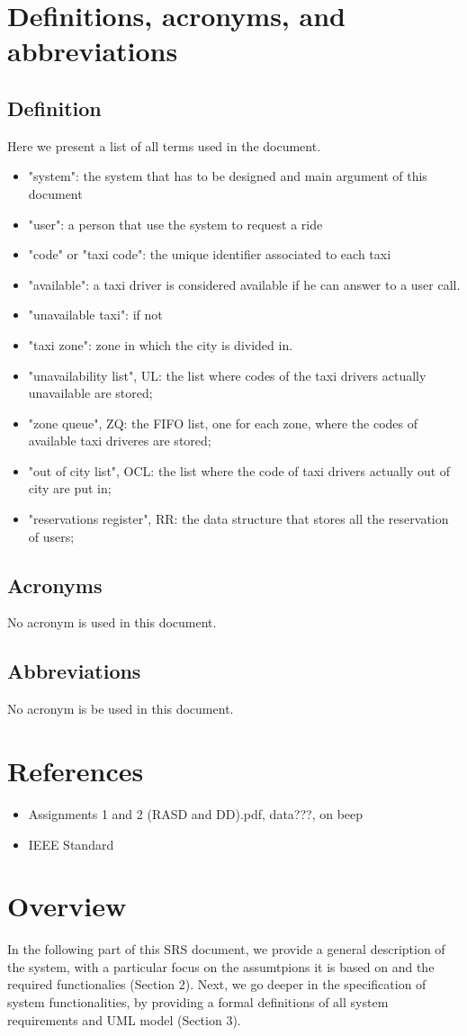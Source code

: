 \section{Definitions, acronyms, and abbreviations}
\subsection{Definition}
Here we present a list of all terms used in the document.
\begin{itemize}
\item "system": the system that has to be designed and main argument of this document
\item "user": a person that use the system to request a ride
\item "code" or "taxi code": the unique identifier associated to each taxi
\item "available": a taxi driver is considered available if he can answer to a user call.
\item "unavailable taxi": if not
\item "taxi zone": zone in which the city is divided in.
\item "unavailability list", UL: the list where codes of the taxi drivers actually unavailable are stored;
\item "zone queue", ZQ: the FIFO list, one for each zone, where the codes of available taxi driveres are stored;
\item "out of city list", OCL: the list where the code of taxi drivers actually out of city are put in;
\item "reservations register", RR: the data structure that stores all the reservation of users;
\end{itemize}


\subsection{Acronyms}
No acronym is used in this document.


\subsection{Abbreviations}
No acronym is be used in this document.


\section{References}
\begin{itemize}
\item Assignments 1 and 2 (RASD and DD).pdf, data???, on beep
\item IEEE Standard
\end{itemize}


\section{Overview}
In the following part of this SRS document, we provide a general description of the system, with a particular focus on the assumtpions it is based on and the required functionalies (Section 2). Next, we go deeper in the specification of system functionalities, by providing a formal definitions of all system requirements and UML model (Section 3).